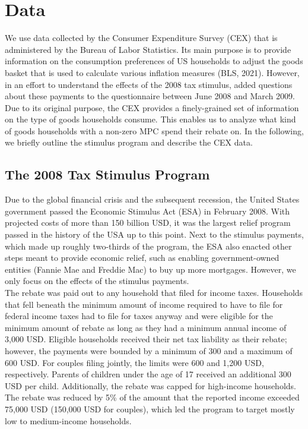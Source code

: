 \section{Data} \label{sec:data}
We use data collected by the Consumer Expenditure Survey (CEX) that is administered by the Bureau of Labor Statistics. Its main purpose is to provide information on the consumption preferences of US households to adjust the goods basket that is used to calculate various inflation measures (BLS, 2021). However, in an effort to understand the effects of the 2008 tax stimulus, \cite{parker_etal_13} added questions about these payments to the questionnaire between June 2008 and March 2009.  Due to its original purpose, the CEX provides a finely-grained set of information on the type of goods households consume. This enables us to analyze what kind of goods households with a non-zero MPC spend their rebate on. In the following, we briefly outline the stimulus program and describe the CEX data. 

\subsection{The 2008 Tax Stimulus Program} 
Due to the global financial crisis and the subsequent recession, the United States government passed the Economic Stimulus Act (ESA) in February 2008. With projected costs of more than 150 billion USD, it was the largest relief program passed in the history of the USA up to this point. Next to the stimulus payments, which made up roughly two-thirds of the program, the ESA also enacted other steps meant to provide economic relief, such as enabling government-owned entities (Fannie Mae and Freddie Mac) to buy up more mortgages. However, we only focus on the effects of the stimulus payments. \\
The rebate was paid out to any household that filed for income taxes. Households that fell beneath the minimum amount of income required to have to file for federal income taxes had to file for taxes anyway and were eligible for the minimum amount of rebate as long as they had a minimum annual income of 3,000 USD. Eligible households received their net tax liability as their rebate; however, the payments were bounded by a minimum of 300 and a maximum of 600 USD. For couples filing jointly, the limits were 600 and 1,200 USD, respectively. Parents of children under the age of 17 received an additional 300 USD per child. Additionally, the rebate was capped for high-income households. The rebate was reduced by 5\% of the amount that the reported income exceeded 75,000 USD (150,000 USD for couples), which led the program to target mostly low to medium-income households.

